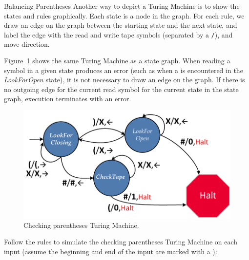 \begin{schemeregion}
\begin{examplenobar}{Balancing Parentheses}
Another way to depict a Turing Machine is to show the states and rules graphically.  Each state is a node in the graph.  For each rule, we draw an edge on the graph between the starting state and the next state, and label the edge with the read and write tape symbols (separated by a \verb|/|), and move direction.  

Figure~\ref{fig:tm-parens} shows the same Turing Machine as a state graph.  When reading a symbol in a given state produces an error (such as when a \tmtext{)} is encountered in the \emph{LookForOpen} state), it is not necessary to draw an edge on the graph.  If there is no outgoing edge for the current read symbol for the current state in the state graph, execution terminates with an error.

\begin{figure}[!htb]
\begin{center}
\includegraphics[width=4.5in]{figures/tm-parens.pdf}
\caption{Checking parentheses Turing Machine.\label{fig:tm-parens}}
\end{center} 
\end{figure}

\beforeex
\begin{exercise}
Follow the rules to simulate the checking parentheses Turing Machine on each input (assume the beginning and end of the input are marked with a \hash):
\begin{subexerciselist}
\item \tmtext{)}



\end{subexerciselist}
\end{exercise}
\end{examplenobar}
\end{schemeregion}
